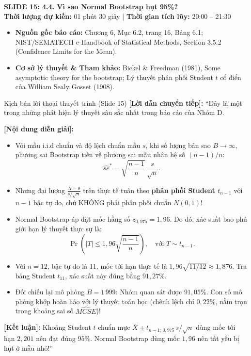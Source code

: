 \documentclass[10pt,a4paper]{article}
\newcommand{\slideheader}[4]{
    \vspace{0.4cm}
    \begin{tcolorbox}[colback=primary!7!white, colframe=primary, arc=2mm, boxrule=1pt, left=4mm, right=4mm, top=2.5mm, bottom=2.5mm]
        {\Large\bfseries\color{primary} SLIDE #1: #2}\\[0.1cm]
        {\small\textbf{Thời lượng dự kiến:} #3 \quad | \quad \textbf{Thời gian tích lũy:} #4}
    \end{tcolorbox}
    \vspace{0.15cm}
}
\begin{document}
\slideheader{15}{4.4. Vì sao Normal Bootstrap hụt 95\%?}{01 phút 30 giây}{20:00 -- 21:30}

\begin{itemize}
    \item \textbf{Nguồn gốc báo cáo:} Chương 6, Mục 6.2, trang 16, Bảng 6.1; NIST/SEMATECH e-Handbook of Statistical Methods, Section 3.5.2 (Confidence Limits for the Mean).
    \item \textbf{Cơ sở lý thuyết \& Tham khảo:} Bickel \& Freedman (1981), Some asymptotic theory for the bootstrap; Lý thuyết phân phối Student $t$ cổ điển của William Sealy Gosset (1908).
\end{itemize}

\begin{scriptbox}{Kịch bản lời thoại thuyết trình (Slide 15)}
    \textbf{[Lời dẫn chuyển tiếp]:} ``Đây là một trong những phát hiện lý thuyết sâu sắc nhất trong báo cáo của Nhóm D.
    
    \textbf{[Nội dung diễn giải]:} 
    \begin{itemize}
        \item Với mẫu i.i.d chuẩn và độ lệch chuẩn mẫu $s$, khi số lượng bản sao $B \to \infty$, phương sai Bootstrap tiến về phương sai mẫu nhân hệ số $(n-1)/n$:
        \[
        \widehat{se}^* = \sqrt{\frac{n-1}{n}}\,\frac{s}{\sqrt{n}}.
        \]
        \item Nhưng đại lượng $\frac{\bar X - \theta}{s/\sqrt{n}}$ trên thực tế tuân theo \textbf{phân phối Student $t_{n-1}$} với $n-1$ bậc tự do, chứ KHÔNG phải phân phối chuẩn $N(0,1)$!
        \item Normal Bootstrap áp đặt mốc hằng số $z_{0{,}975} = 1{,}96$. Do đó, xác suất bao phủ giới hạn lý thuyết thực sự là:
        \[
        \Pr\left(|T| \le 1{,}96\sqrt{\frac{n-1}{n}}\right), \quad \text{với } T \sim t_{n-1}.
        \]
        \item Với $n=12$, bậc tự do là 11, mốc tới hạn thực tế là $1{,}96\sqrt{11/12} \approx 1{,}876$. Tra bảng Student $t_{11}$, xác suất này đúng bằng \textbf{$91{,}27\%$}.
        \item Đối chiếu lại mô phỏng $B=1\,999$: Nhóm quan sát được \textbf{$91{,}05\%$}. Con số mô phỏng khớp hoàn hảo với lý thuyết toán học (chênh lệch chỉ $0{,}22\%$, nằm trọn trong khoảng sai số $\widehat{MCSE}$)!
    \end{itemize}
    \textbf{[Kết luận]:} Khoảng Student $t$ chuẩn mực $\bar X \pm t_{n-1;\,0{,}975}\,s/\sqrt{n}$ dùng mốc tới hạn $2{,}201$ nên đạt đúng $95\%$. Normal Bootstrap dùng mốc $1{,}96$ nên tất yếu bị hụt ở mẫu nhỏ!''
\end{scriptbox}
\end{document}
